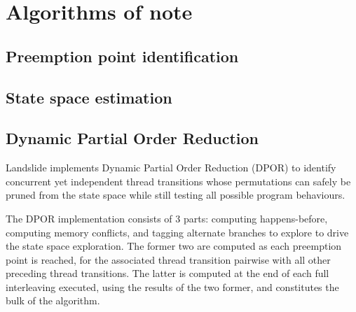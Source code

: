 
\section{Algorithms of note}



\subsection{Preemption point identification}
\label{sec:landslide-pps}

\subsection{State space estimation}
\label{sec:landslide-estimate}

\subsection{Dynamic Partial Order Reduction}
\label{sec:landslide-dpor}

Landslide implements Dynamic Partial Order Reduction (DPOR) \cite{dpor}
to identify concurrent yet independent thread transitions
whose permutations can safely be pruned from the state space
while still testing all possible program behaviours.

The DPOR implementation consists of 3 parts:
computing happens-before,
computing memory conflicts,
and tagging alternate branches to explore to drive the state space exploration.
The former two are computed as each preemption point is reached,
for the associated thread transition pairwise with all other preceding thread transitions.
The latter is computed at the end of each full interleaving executed, using the results of the two former,
and constitutes the bulk of the algorithm.

